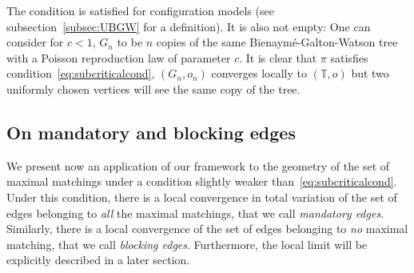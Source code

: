 \documentclass[11pt]{article}
\begin{document}
\begin{remark}
    The condition is satisfied for configuration models (see subsection~\ref{subsec:UBGW} for a definition). It is also not empty: One can consider for $c<1$, $G_n$ to be $n$ copies of the same Bienaymé-Galton-Watson tree with a Poisson reproduction law of parameter $c$. It is clear that $\pi$ satisfies condition~\eqref{eq:subcriticalcond}, $(G_n,o_n)$ converges locally to $(\mathbb{T},o)$ but two uniformly chosen vertices will see the same copy of the tree.
\end{remark}

\subsection{On mandatory and blocking edges}

We present now an application of our framework to the geometry  of the set of maximal matchings under a condition slightly weaker than~\eqref{eq:subcriticalcond}. Under this condition, there is a local convergence in total variation of the set of edges belonging to {\it all} the maximal matchings, that we call {\it mandatory edges}. Similarly, there is a local convergence of the set of edges belonging to {\it no} maximal matching, that we call {\it blocking edges}. Furthermore, the local limit will be explicitly described in a later section.
\end{document}
